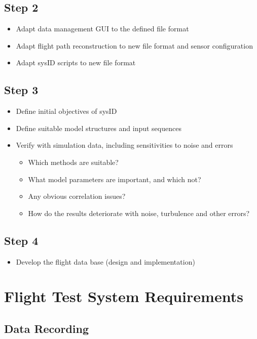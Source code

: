 \documentclass[11pt,a4paper]{article}
\begin{document}
\subsection{Step 2}

\begin{itemize}
\item Adapt data management GUI to the defined file format
\item Adapt flight path reconstruction to new file format and sensor configuration
\item Adapt sysID scripts to new file format
\end{itemize}

\subsection{Step 3}

\begin{itemize}
\item Define initial objectives of sysID
\item Define suitable model structures and input sequences
\item Verify with simulation data, including sensitivities to noise and errors
	\begin{itemize}
	\item Which methods are suitable?
	\item What model parameters are important, and which not?
	\item Any obvious correlation issues?
	\item How do the results deteriorate with noise, turbulence and other errors?
	\end{itemize}
\end{itemize}

\subsection{Step 4}

\begin{itemize}
\item Develop the flight data base (design and implementation)
\end{itemize}


\clearpage
\section{Flight Test System Requirements}
\label{fti_req}

\subsection{Data Recording}
\end{document}
